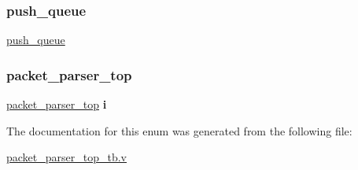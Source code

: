 \mbox{\label{enumpacket__parser__top__tb_ad3a4f0399068428438a4d1280e7547d4}} 
\subsubsection{\texorpdfstring{push\+\_\+queue}{push\_queue}}
{\footnotesize\ttfamily \mbox{\hyperlink{enumpacket__parser__top__tb_ad3a4f0399068428438a4d1280e7547d4}{push\+\_\+queue}} {\bfseries \textcolor{vhdlchar}{ }} \hspace{0.3cm}}

\mbox{\label{enumpacket__parser__top__tb_a7123921cf22dcde880af6f141d7f186d}} 
\subsubsection{\texorpdfstring{packet\+\_\+parser\+\_\+top}{packet\_parser\_top}}
{\footnotesize\ttfamily \mbox{\hyperlink{enumpacket__parser__top__tb_a7123921cf22dcde880af6f141d7f186d}{packet\+\_\+parser\+\_\+top}} {\bfseries \textcolor{vhdlchar}{i}\textcolor{vhdlchar}{ }} \hspace{0.3cm}}



The documentation for this enum was generated from the following file\+:\begin{DoxyCompactItemize}
\item 
\mbox{\hyperlink{packet__parser__top__tb_8v}{packet\+\_\+parser\+\_\+top\+\_\+tb.\+v}}\end{DoxyCompactItemize}
